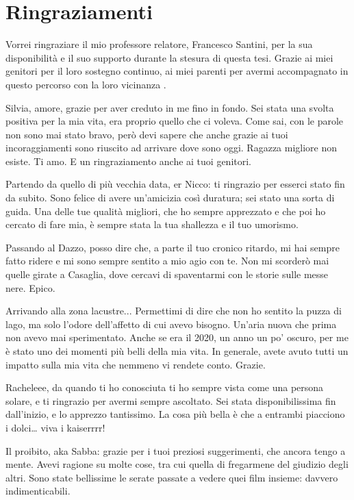 \chapter*{Ringraziamenti}

Vorrei ringraziare il mio professore relatore, 
Francesco Santini, per la sua disponibilità e 
il suo supporto durante la stesura di questa tesi. 
Grazie ai miei genitori per il loro sostegno continuo, 
ai miei parenti per avermi accompagnato 
in questo percorso con la loro vicinanza .

Silvia, amore,
grazie per aver creduto in me fino in fondo. Sei stata una svolta positiva per la mia vita, era proprio quello che ci voleva.
Come sai, con le parole non sono mai stato bravo, però devi sapere che anche grazie ai tuoi incoraggiamenti sono riuscito ad arrivare dove sono oggi.
Ragazza migliore non esiste. Ti amo.
E un ringraziamento anche ai tuoi genitori.

Partendo da quello di più vecchia data, er Nicco:
ti ringrazio per esserci stato fin da subito. Sono felice di avere un’amicizia così duratura; sei stato una sorta di guida.
Una delle tue qualità migliori, che ho sempre apprezzato e che poi ho cercato di fare mia, è sempre stata la tua shallezza e il tuo umorismo.

Passando al Dazzo, posso dire che, a parte il tuo cronico ritardo,
mi hai sempre fatto ridere e mi sono sempre sentito a mio agio con te.
Non mi scorderò mai quelle girate a Casaglia, dove cercavi di spaventarmi con le storie sulle messe nere. Epico.

Arrivando alla zona lacustre...
Permettimi di dire che non ho sentito la puzza di lago, ma solo l’odore dell’affetto di cui avevo bisogno.
Un’aria nuova che prima non avevo mai sperimentato.
Anche se era il 2020, un anno un po’ oscuro, per me è stato uno dei momenti più belli della mia vita.
In generale, avete avuto tutti un impatto sulla mia vita che nemmeno vi rendete conto. Grazie.

Racheleee,
da quando ti ho conosciuta ti ho sempre vista come una persona solare, e ti ringrazio per avermi sempre ascoltato.
Sei stata disponibilissima fin dall’inizio, e lo apprezzo tantissimo.
La cosa più bella è che a entrambi piacciono i dolci… viva i kaiserrrr!

Il proibito, aka Sabba:
grazie per i tuoi preziosi suggerimenti, che ancora tengo a mente.
Avevi ragione su molte cose, tra cui quella di fregarmene del giudizio degli altri.
Sono state bellissime le serate passate a vedere quei film insieme: davvero indimenticabili.

